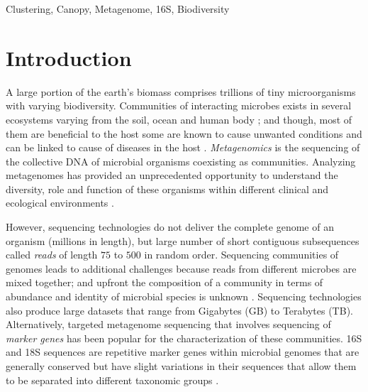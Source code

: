 \documentclass[10pt, conference, compsocconf]{IEEEtran}
\begin{document}
\begin{IEEEkeywords}
Clustering, Canopy, Metagenome, 16S, Biodiversity 
\end{IEEEkeywords}

%
\IEEEpeerreviewmaketitle

\section{Introduction}
\label{intro}


A large portion of the  earth's biomass 
comprises trillions of tiny  microorganisms 
with varying  biodiversity.  Communities
of interacting microbes  exists in several 
ecosystems varying from the soil, ocean 
and human body \cite{MARHumanMicro}; and though, most of 
them are beneficial to the host some are known to cause 
unwanted conditions and can be linked to cause of 
diseases in the host \cite{MARTurnbaugh}. 
%
\emph{Metagenomics} is the 
sequencing of the collective DNA  of 
microbial organisms coexisting as communities. Analyzing 
metagenomes has provided an unprecedented 
opportunity to understand the diversity, role and 
function of these organisms within different 
clinical and ecological environments \cite{MARHumanGut}\cite{MARMihaiPop}.


However, sequencing technologies do not deliver the 
complete genome of an organism (millions in length), but 
large number of short contiguous 
subsequences called \emph{reads} of length $75$ to $500$ in 
random order. Sequencing communities of genomes 
leads to additional challenges because reads 
from different microbes are mixed together; and 
upfront  the composition of a community in terms of 
abundance and identity of microbial species
is unknown \cite{MARMetaChallenge}. Sequencing technologies also 
produce large 
datasets that range from Gigabytes (GB) to Terabytes (TB).  Alternatively, 
targeted metagenome sequencing  that 
involves sequencing of \emph{marker genes} has been 
popular for the characterization of these communities. 16S and 18S 
sequences are repetitive marker genes within microbial genomes that 
are generally conserved but 
have slight 
variations in their sequences 
that allow them to be separated into different 
taxonomic groups \cite{MAR16S}. 
\end{document}
